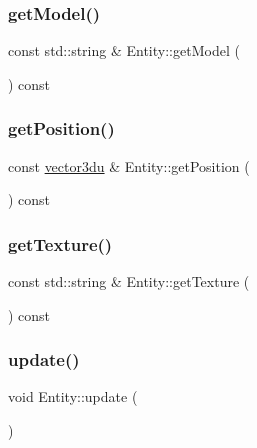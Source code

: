\subsubsection{\texorpdfstring{getModel()}{getModel()}}
{\footnotesize\ttfamily const std\+::string \& Entity\+::get\+Model (\begin{DoxyParamCaption}{ }\end{DoxyParamCaption}) const}

\mbox{\label{class_entity_a7290deb888c80712ed57aa332f0c78e0}} 
\subsubsection{\texorpdfstring{getPosition()}{getPosition()}}
{\footnotesize\ttfamily const \mbox{\hyperlink{_utility_8hpp_ac675fa2b6c79d0be47ae76e5d0ce38a8}{vector3du}} \& Entity\+::get\+Position (\begin{DoxyParamCaption}{ }\end{DoxyParamCaption}) const}

\mbox{\label{class_entity_a22955fbd8023631114a0a37189ad182b}} 
\subsubsection{\texorpdfstring{getTexture()}{getTexture()}}
{\footnotesize\ttfamily const std\+::string \& Entity\+::get\+Texture (\begin{DoxyParamCaption}{ }\end{DoxyParamCaption}) const}

\mbox{\label{class_entity_a00b6eeaf99b35c8f8b10b5fbfc1baf4f}} 
\subsubsection{\texorpdfstring{update()}{update()}}
{\footnotesize\ttfamily void Entity\+::update (\begin{DoxyParamCaption}{ }\end{DoxyParamCaption})\hspace{0.3cm}{\ttfamily [virtual]}}

